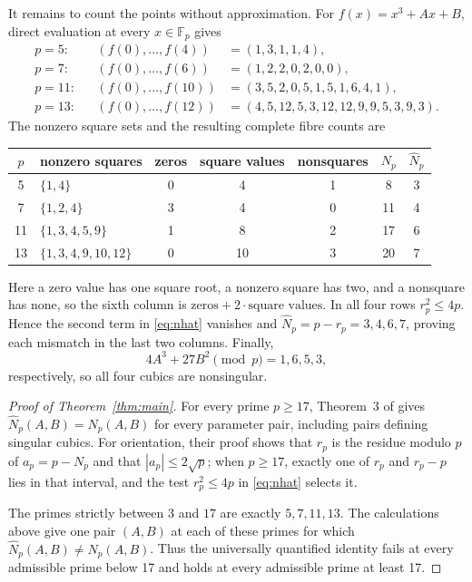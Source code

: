 \documentclass[11pt]{article}
\newcommand{\F}{\mathbb F}
\begin{document}
It remains to count the points without approximation.  For
\(f(x)=x^3+Ax+B\), direct evaluation at every \(x\in\F_p\) gives
{\small
\begin{align*}
p=5:  &&(f(0),\ldots,f(4))&=(1,3,1,1,4),\\
p=7:  &&(f(0),\ldots,f(6))&=(1,2,2,0,2,0,0),\\
p=11: &&(f(0),\ldots,f(10))&=(3,5,2,0,5,1,5,1,6,4,1),\\
p=13: &&(f(0),\ldots,f(12))&=(4,5,12,5,3,12,12,9,9,5,3,9,3).
\end{align*}}
The nonzero square sets and the resulting complete fibre counts are

\begin{center}
\begin{tabular}{@{}clccccc@{}}
\toprule
\(p\) & nonzero squares & zeros & square values & nonsquares
      & \(N_p\) & \(\widehat N_p\) \\
\midrule
5  & \(\{1,4\}\)             & 0 & 4  & 1 & 8  & 3 \\
7  & \(\{1,2,4\}\)           & 3 & 4  & 0 & 11 & 4 \\
11 & \(\{1,3,4,5,9\}\)       & 1 & 8  & 2 & 17 & 6 \\
13 & \(\{1,3,4,9,10,12\}\)   & 0 & 10 & 3 & 20 & 7 \\
\bottomrule
\end{tabular}
\end{center}

Here a zero value has one square root, a nonzero square has two, and a
nonsquare has none, so the sixth column is \(\text{zeros}+2\cdot
\text{square values}\).  In all four rows \(r_p^2\leq4p\).  Hence the second
term in \eqref{eq:nhat} vanishes and
\(\widehat N_p=p-r_p=3,4,6,7\), proving each mismatch in the last two
columns.  Finally,
\[
 4A^3+27B^2\pmod p=1,6,5,3,
\]
respectively, so all four cubics are nonsingular.

\begin{proof}[Proof of Theorem~\ref{thm:main}]
For every prime \(p\geq17\), Theorem~3 of
\cite{DumitruPrunescu2026} gives \(\widehat N_p(A,B)=N_p(A,B)\) for every
parameter pair, including pairs defining singular cubics.  For orientation,
their proof shows that \(r_p\) is the residue modulo \(p\) of
\(a_p=p-N_p\) and that \(|a_p|\leq2\sqrt p\); when \(p\geq17\), exactly one
of \(r_p\) and \(r_p-p\) lies in that interval, and the test
\(r_p^2\leq4p\) in \eqref{eq:nhat} selects it.

The primes strictly between \(3\) and \(17\) are exactly
\(5,7,11,13\).  The calculations above give one pair \((A,B)\) at each of
these primes for which \(\widehat N_p(A,B)\ne N_p(A,B)\).  Thus the
universally quantified identity fails at every admissible prime below 17 and
holds at every admissible prime at least 17.
\end{proof}
\end{document}
